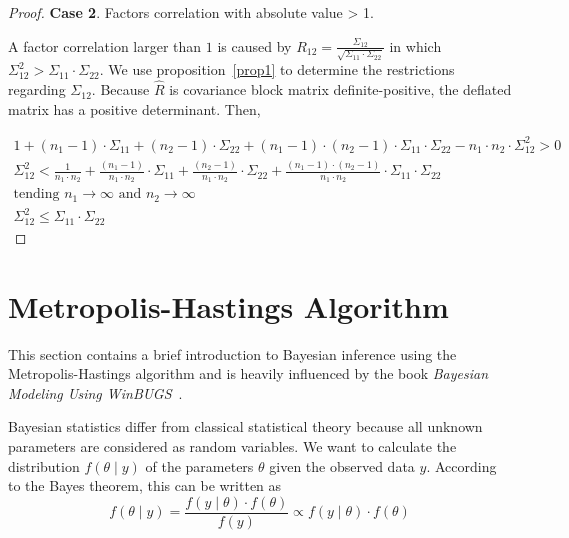 \documentclass[11pt,fleqn]{book} %
\begin{document}
\begin{proof}
	\textbf{Case 2}. Factors correlation with absolute value > 1.
	\begin{adjustwidth}{1cm}{0pt}
		A factor correlation larger than $1$ is caused by 
		$R_{12} = \frac{\Sigma_{12}}{\sqrt{\Sigma_{11} \cdot \Sigma_{22}}}$
		in which $\Sigma_{12}^2 > \Sigma_{11} \cdot \Sigma_{22}$.
		We use proposition~\ref{prop1} to determine the restrictions regarding 
		$\Sigma_{12}$. Because $\widehat{R}$ is covariance block matrix 
		definite-positive, the deflated matrix has a positive determinant. 
		Then,
	\end{adjustwidth}
	\begin{displaymath}
		\begin{array}{l}
			1 + (n_1-1) \cdot \Sigma_{11} + (n_2-1) \cdot \Sigma_{22} +
			(n_1-1) \cdot (n_2-1) \cdot \Sigma_{11} \cdot \Sigma_{22} -
			n_1 \cdot n_2 \cdot \Sigma_{12}^2 > 0
			\\
			\Sigma_{12}^2 <
			\frac{1}{n_1 \cdot n_2} +
			\frac{(n_1-1)}{n_1 \cdot n_2} \cdot \Sigma_{11} +
			\frac{(n_2-1)}{n_1 \cdot n_2} \cdot \Sigma_{22} +
			\frac{(n_1-1) \cdot (n_2-1)}{n_1 \cdot n_2} \cdot \Sigma_{11} \cdot \Sigma_{22}
			\\
			\text{tending } n_1 \to \infty \text{ and } n_2 \to \infty
			\\
			\Sigma_{12}^2 \le \Sigma_{11} \cdot \Sigma_{22}
		\end{array}
	\end{displaymath}
\end{proof}

\section{Metropolis-Hastings Algorithm}
\label{ap:mha}

This section contains a brief introduction to Bayesian inference using 
the Metropolis-Hastings algorithm and is heavily influenced by the book 
\emph{Bayesian Modeling Using WinBUGS}~\cite{ntzoufras:2009}.

Bayesian statistics differ from classical statistical theory because all 
unknown parameters are considered as random variables. We want to calculate 
the distribution $f(\theta \mid y)$ of the parameters $\theta$ given the 
observed data $y$. According to the Bayes theorem, this can be written as
\begin{displaymath}
	f(\theta \mid y) = \frac{f(y \mid \theta) \cdot f(\theta)}{f(y)} \propto f(y \mid \theta) \cdot f(\theta)
\end{displaymath}
\end{document}

